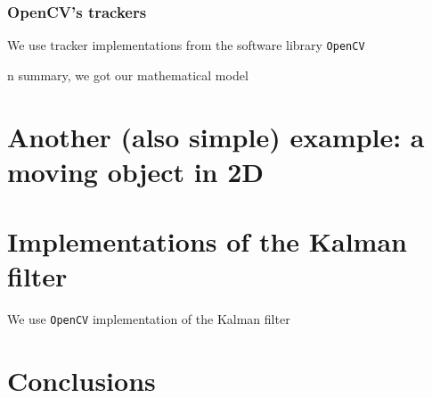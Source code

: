 \documentclass[12pt,a4paper,final]{article} %
\begin{document}
\subsubsection{OpenCV's trackers}
\label{sec:opencv_trackers}
We use tracker implementations from the software library
\texttt{OpenCV} \cite{opencv:2000:AR}


n summary, we got our mathematical model

\section{Another (also simple) example: a moving object in 2D}
\label{sec:example2D}


\section{Implementations of the Kalman filter}
We use \texttt{OpenCV} \cite{opencv:2000:AR} implementation of
the Kalman filter

\section{Conclusions}

\printbibliography[heading=bibintoc]
\end{document}
